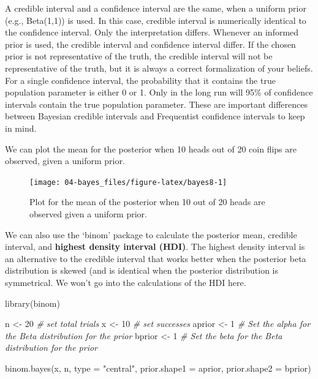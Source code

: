 \documentclass[
  oneside]{book}
\newenvironment{Shaded}{\begin{snugshade}}{\end{snugshade}}
\newcommand{\AttributeTok}[1]{\textcolor[rgb]{0.77,0.63,0.00}{#1}}
\newcommand{\CommentTok}[1]{\textcolor[rgb]{0.56,0.35,0.01}{\textit{#1}}}
\newcommand{\DecValTok}[1]{\textcolor[rgb]{0.00,0.00,0.81}{#1}}
\newcommand{\FunctionTok}[1]{\textcolor[rgb]{0.00,0.00,0.00}{#1}}
\newcommand{\NormalTok}[1]{#1}
\newcommand{\OtherTok}[1]{\textcolor[rgb]{0.56,0.35,0.01}{#1}}
\newcommand{\StringTok}[1]{\textcolor[rgb]{0.31,0.60,0.02}{#1}}
\begin{document}
A credible interval and a confidence interval are the same, when a uniform prior (e.g., Beta(1,1)) is used. In this case, credible interval is numerically identical to the confidence interval. Only the interpretation differs. Whenever an informed prior is used, the credible interval and confidence interval differ. If the chosen prior is not representative of the truth, the credible interval will not be representative of the truth, but it is always a correct formalization of your beliefs. For a single confidence interval, the probability that it contains the true population parameter is either 0 or 1. Only in the long run will 95\% of confidence intervals contain the true population parameter. These are important differences between Bayesian credible intervals and Frequentist confidence intervals to keep in mind.

We can plot the mean for the posterior when 10 heads out of 20 coin flips are observed, given a uniform prior.



\begin{figure}

{\centering \texttt{[image: 04-bayes\_files/figure-latex/bayes8-1]} 

}

\caption{Plot for the mean of the posterior when 10 out of 20 heads are observed given a uniform prior.}\label{fig:bayes8}
\end{figure}

We can also use the `binom' package to calculate the posterior mean, credible interval, and \textbf{highest density interval (HDI)}. The highest density interval is an alternative to the credible interval that works better when the posterior beta distribution is skewed (and is identical when the posterior distribution is symmetrical. We won't go into the calculations of the HDI here.

\begin{Shaded}
\begin{Highlighting}[]
\FunctionTok{library}\NormalTok{(binom)}

\NormalTok{n }\OtherTok{\textless{}{-}} \DecValTok{20} \CommentTok{\# set total trials}
\NormalTok{x }\OtherTok{\textless{}{-}} \DecValTok{10} \CommentTok{\# set successes}
\NormalTok{aprior }\OtherTok{\textless{}{-}} \DecValTok{1} \CommentTok{\# Set the alpha for the Beta distribution for the prior}
\NormalTok{bprior }\OtherTok{\textless{}{-}} \DecValTok{1} \CommentTok{\# Set the beta for the Beta distribution for the prior}

\FunctionTok{binom.bayes}\NormalTok{(x, n, }\AttributeTok{type =} \StringTok{"central"}\NormalTok{, }\AttributeTok{prior.shape1 =}\NormalTok{ aprior, }\AttributeTok{prior.shape2 =}\NormalTok{ bprior)}
\end{Highlighting}
\end{Shaded}
\end{document}
